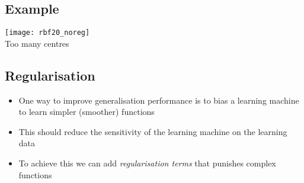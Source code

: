 
\begin{slide}
\section[-1.5]{Example}

\begin{PauseHighLight}

\begin{center}
  \texttt{[image: rbf20\_noreg]}\\
  Too many centres
\end{center}

\end{PauseHighLight}
\end{slide}


\Outline %

\begin{slide}
\section{Regularisation}

\begin{PauseHighLight}
  \begin{itemize}
  \item One way to improve generalisation performance is to bias a
    learning machine to learn simpler (smoother) functions\pause
  \item This should reduce the sensitivity of the learning machine on
    the learning data\pause
  \item To achieve this we can add \emph{regularisation terms} that
    punishes complex functions\pause
  \end{itemize}
\end{PauseHighLight}

\end{slide}




